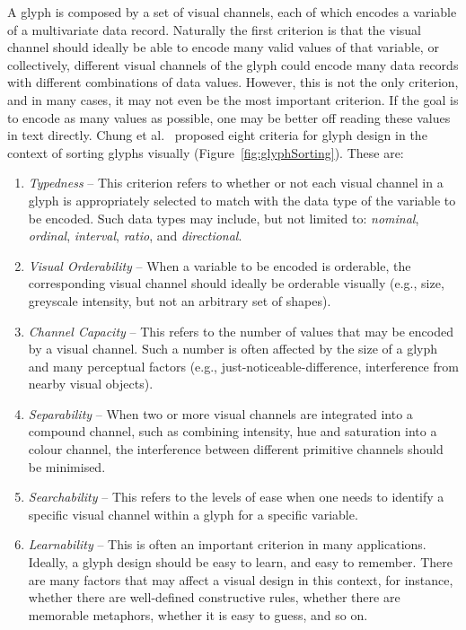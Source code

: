 A glyph is composed by a set of visual channels, each of which encodes a variable of a multivariate data record. Naturally the first criterion is that the visual channel should ideally be able to encode many valid values of that variable, or collectively, different visual channels of the glyph could encode many data records with different combinations of data values. However, this is not the only criterion, and in many cases, it may not even be the most important criterion. If the goal is to encode as many values as possible, one may be better off reading these values in text directly. Chung et al.~\cite{chung13glyphSorting} proposed eight criteria for glyph design in the context of sorting glyphs visually (Figure~\ref{fig:glyphSorting}). These are:

\renewcommand\theenumi {\alph{enumi}}
\begin{enumerate}
\item \emph{Typedness} -- This criterion refers to whether or not each visual channel in a glyph is appropriately selected to match with the data type of the variable to be encoded. Such data types may include, but not limited to: \emph{nominal}, \emph{ordinal}, \emph{interval}, \emph{ratio}, and \emph{directional}.
%
\item \emph{Visual Orderability} -- When a variable to be encoded is orderable, the corresponding visual channel should ideally be orderable visually (e.g., size, greyscale intensity, but not an arbitrary set of shapes). 
%
\item \emph{Channel Capacity} -- This refers to the number of values that may be encoded by a visual channel. Such a number is often affected by the size of a glyph and many perceptual factors (e.g., just-noticeable-difference, interference from nearby visual objects). 
%
\item \emph{Separability} -- When two or more visual channels are integrated into a compound channel, such as combining intensity, hue and saturation into a colour channel, the interference between different primitive channels should be minimised.
%
\item \emph{Searchability} -- This refers to the levels of ease when one needs to identify a specific visual channel within a glyph for a specific variable.
%
\item \emph{Learnability} -- This is often an important criterion in many applications. Ideally, a glyph design should be easy to learn, and easy to remember. There are many factors that may affect a visual design in this context, for instance, whether there are well-defined constructive rules, whether there are memorable metaphors, whether it is easy to guess, and so on.

\end{enumerate}

